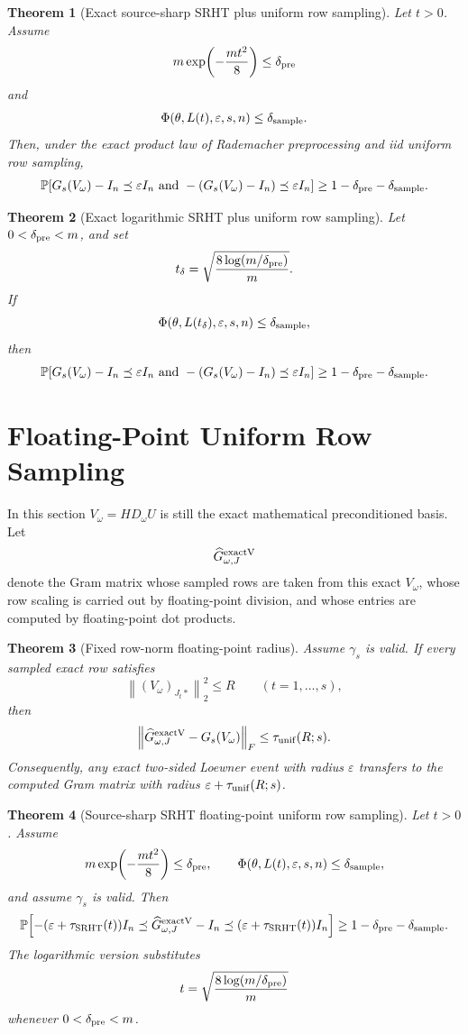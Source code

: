 \documentclass[11pt]{article}
\newcommand{\Prob}{\mathbb{P}}
\newcommand{\Frob}[1]{\left\lVert #1\right\rVert_F}
\newcommand{\Norm}[1]{\left\lVert #1\right\rVert_2}
\newcommand{\I}{I}
\newcommand{\eps}{\varepsilon}
\newtheorem{theorem}{Theorem}
\theoremstyle{remark}
\begin{document}
\begin{theorem}[Exact source-sharp SRHT plus uniform row sampling]
Let \(t>0\).  Assume
\[
  m\exp\!\left(-\frac{mt^2}{8}\right)
  \le
  \delta_{\rm pre}
\]
and
\[
  \Phi(\theta,L(t),\eps,s,n)\le\delta_{\rm sample}.
\]
Then, under the exact product law of Rademacher preprocessing and iid uniform
row sampling,
\[
  \Prob\!\left[
    G_s(V_\omega)-\I_n\preceq\eps\I_n
    \ \text{and}\
    -(G_s(V_\omega)-\I_n)\preceq\eps\I_n
  \right]
  \ge
  1-\delta_{\rm pre}-\delta_{\rm sample}.
\]
\end{theorem}

\begin{theorem}[Exact logarithmic SRHT plus uniform row sampling]
Let \(0<\delta_{\rm pre}<m\), and set
\[
  t_\delta=\sqrt{\frac{8\log(m/\delta_{\rm pre})}{m}} .
\]
If
\[
  \Phi(\theta,L(t_\delta),\eps,s,n)\le\delta_{\rm sample},
\]
then
\[
  \Prob\!\left[
    G_s(V_\omega)-\I_n\preceq\eps\I_n
    \ \text{and}\
    -(G_s(V_\omega)-\I_n)\preceq\eps\I_n
  \right]
  \ge
  1-\delta_{\rm pre}-\delta_{\rm sample}.
\]
\end{theorem}

\section*{Floating-Point Uniform Row Sampling}

In this section \(V_\omega=HD_\omega U\) is still the exact mathematical
preconditioned basis.  Let
\[
  \widehat G_{\omega,J}^{\rm exactV}
\]
denote the Gram matrix whose sampled rows are taken from this exact
\(V_\omega\), whose row scaling is carried out by floating-point division, and
whose entries are computed by floating-point dot products.

\begin{theorem}[Fixed row-norm floating-point radius]
Assume \(\gamma_s\) is valid.  If every sampled exact row satisfies
\[
  \Norm{(V_\omega)_{J_t*}}^2\le R
  \qquad(t=1,\ldots,s),
\]
then
\[
  \Frob{
    \widehat G_{\omega,J}^{\rm exactV}-G_s(V_\omega)
  }
  \le
  \tau_{\rm unif}(R;s).
\]
Consequently, any exact two-sided Loewner event with radius \(\eps\) transfers
to the computed Gram matrix with radius
\(\eps+\tau_{\rm unif}(R;s)\).
\end{theorem}

\begin{theorem}[Source-sharp SRHT floating-point uniform row sampling]
Let \(t>0\).  Assume
\[
  m\exp\!\left(-\frac{mt^2}{8}\right)
  \le
  \delta_{\rm pre},
  \qquad
  \Phi(\theta,L(t),\eps,s,n)\le\delta_{\rm sample},
\]
and assume \(\gamma_s\) is valid.  Then
\[
  \Prob\!\left[
    -(\eps+\tau_{\rm SRHT}(t))\I_n
    \preceq
    \widehat G_{\omega,J}^{\rm exactV}-\I_n
    \preceq
    (\eps+\tau_{\rm SRHT}(t))\I_n
  \right]
  \ge
  1-\delta_{\rm pre}-\delta_{\rm sample}.
\]
The logarithmic version substitutes
\[
  t=\sqrt{\frac{8\log(m/\delta_{\rm pre})}{m}}
\]
whenever \(0<\delta_{\rm pre}<m\).
\end{theorem}
\end{document}
